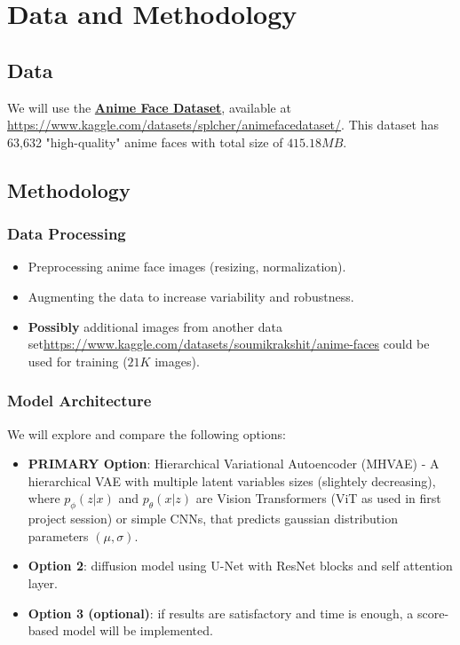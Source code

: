 \documentclass[twocolumn,superscriptaddress,aps]{revtex4-1}
\begin{document}
\section{Data and Methodology}

\subsection{Data}
We will use the \href{https://www.kaggle.com/datasets/splcher/animefacedataset/}{\textbf{Anime Face Dataset}}, available at \url{https://www.kaggle.com/datasets/splcher/animefacedataset/}. This dataset has 63,632 "high-quality" anime faces with total size of $415.18 MB$.

\subsection{Methodology}

\subsubsection{Data Processing}
\begin{itemize}
    \item Preprocessing anime face images (resizing, normalization).
    \item Augmenting the data to increase variability and robustness.
    \item \textbf{Possibly} additional images from another data set\url{https://www.kaggle.com/datasets/soumikrakshit/anime-faces} could be used for training ($21K$ images).
\end{itemize}

\subsubsection{Model Architecture}
We will explore and compare the following options:
\begin{itemize}
    \item \textbf{PRIMARY Option}: Hierarchical Variational Autoencoder (MHVAE) - A hierarchical VAE with multiple latent variables sizes (slightely decreasing), where $p_\phi (z|x)$ and $p_\theta (x|z)$ are Vision Transformers (ViT as used in first project session) or simple CNNs, that predicts gaussian distribution parameters $(\mu, \sigma)$.
    \item \textbf{Option 2}: diffusion model using U-Net with ResNet blocks and self attention layer.
    \item \textbf{Option 3 (optional)}: if results are satisfactory and time is enough, a score-based model will be implemented.
\end{itemize}
\end{document}
